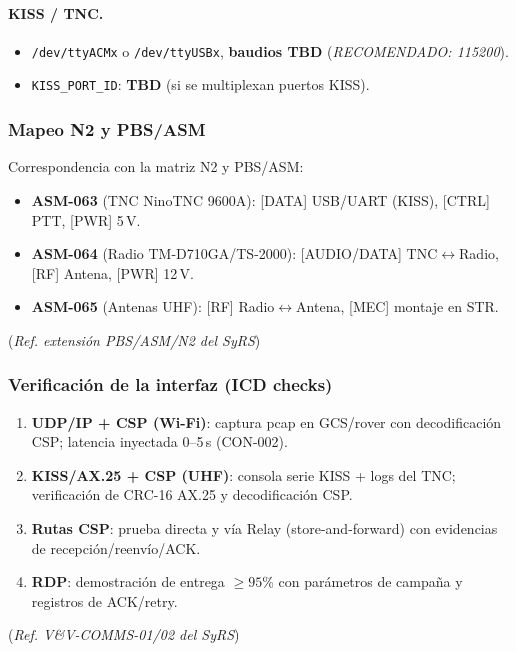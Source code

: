 \paragraph{KISS / TNC.}
\begin{itemize}
  \item \texttt{/dev/ttyACMx} o \texttt{/dev/ttyUSBx}, \textbf{baudios TBD} (\emph{RECOMENDADO: 115200}).
  \item \texttt{KISS\_PORT\_ID}: \textbf{TBD} (si se multiplexan puertos KISS).
\end{itemize}

\subsubsection{Mapeo N2 y PBS/ASM}
Correspondencia con la matriz N2 y PBS/ASM:
\begin{itemize}
  \item \textbf{ASM-063} (TNC NinoTNC 9600A): [DATA] USB/UART (KISS), [CTRL] PTT, [PWR] 5\,V.
  \item \textbf{ASM-064} (Radio TM-D710GA/TS-2000): [AUDIO/DATA] TNC$\leftrightarrow$Radio, [RF] Antena, [PWR] 12\,V.
  \item \textbf{ASM-065} (Antenas UHF): [RF] Radio$\leftrightarrow$Antena, [MEC] montaje en STR.
\end{itemize}
(\emph{Ref. extensión PBS/ASM/N2 del SyRS})%

\subsubsection{Verificación de la interfaz (ICD checks)}
\begin{enumerate}
  \item \textbf{UDP/IP + CSP (Wi-Fi)}: captura pcap en GCS/rover con decodificación CSP; latencia inyectada 0–5\,s (CON-002).
  \item \textbf{KISS/AX.25 + CSP (UHF)}: consola serie KISS + logs del TNC; verificación de CRC-16 AX.25 y decodificación CSP.
  \item \textbf{Rutas CSP}: prueba directa y vía Relay (store-and-forward) con evidencias de recepción/reenvío/ACK.
  \item \textbf{RDP}: demostración de entrega $\geq 95\%$ con parámetros de campaña y registros de ACK/retry.
\end{enumerate}
(\emph{Ref. V\&V-COMMS-01/02 del SyRS})%

